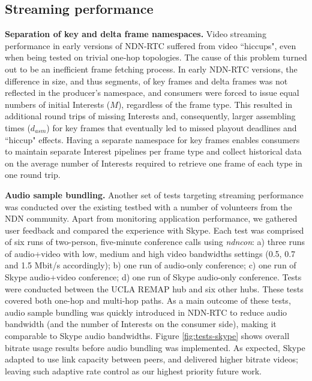 \documentclass{icn/sig-alternate-2013} %
\newcommand{\ndnrtcName}{NDN-RTC} %
\newcommand{\ndnconName}{\emph{ndncon}}
\begin{document}
\subsection{Streaming performance}

\textbf{Separation of key and delta frame namespaces.} Video streaming performance in early versions of \ndnrtcName{} suffered from video ``hiccups", even when being tested on trivial one-hop topologies. The cause of this problem turned out to be an inefficient frame fetching process.
 In early \ndnrtcName{} versions, the difference in size, and thus segments, of key frames and delta frames was not reflected in the producer's namespace, and consumers were forced to issue equal numbers of initial Interests ($M$), regardless of the frame type. This resulted in additional round trips of missing Interests and, consequently, larger assembling times ($d_{asm}$) for key frames that eventually led to missed playout deadlines and ``hiccup" effects. Having a separate namespace for key frames enables consumers to maintain separate Interest pipelines per frame type and collect historical data on the average number of Interests required to retrieve one frame of each type in one round trip. 

\textbf{Audio sample bundling.}
Another set of tests targeting streaming performance was conducted over the existing testbed with a number of volunteers from the NDN community. Apart from monitoring application performance, we gathered user feedback and compared the experience with Skype. 
Each test was comprised of six runs of two-person, five-minute conference calls using \ndnconName{}: a) three runs of audio+video with low, medium and high video bandwidths settings (0.5, 0.7 and 1.5 Mbit/s accordingly); b) one run of audio-only conference; c) one run of Skype audio+video conference; d) one run of Skype audio-only conference. Tests were conducted between the UCLA REMAP hub and six other hubs. These tests covered both one-hop and multi-hop paths. 
As a main outcome of these tests, audio sample bundling was quickly introduced in \ndnrtcName{} to reduce audio bandwidth (and the number of Interests on the consumer side), making it comparable to Skype audio bandwidths. Figure \ref{fig:tests-skype} shows overall bitrate usage results before audio bundling was implemented. As expected, Skype adapted to use link capacity between peers, and delivered higher bitrate videos; leaving such adaptive rate control as our highest priority future work. %
\end{document}
